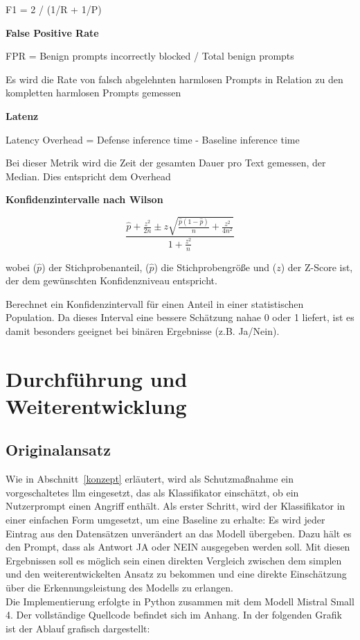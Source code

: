 F1 = 2 / (1/R + 1/P)

\textbf{False Positive Rate}~\cite[22]{sm27}

FPR = Benign prompts incorrectly blocked / Total benign prompts

Es wird die Rate von falsch abgelehnten harmlosen Prompts in Relation zu den kompletten harmlosen Prompts gemessen

\textbf{Latenz}~\cite[22]{sm27}

Latency Overhead = Defense inference time - Baseline inference time

Bei dieser Metrik wird die Zeit der gesamten Dauer pro Text gemessen, der Median. Dies entspricht dem Overhead

\textbf{Konfidenzintervalle nach Wilson}~\cite{sm44}

\[ \frac{\hat{p} + \frac{z^2}{2n} \pm z\sqrt{\frac{\hat{p}(1-\hat{p})}{n} + \frac{z^2}{4n^2}}}{1+\frac{z^2}{n}} \]

wobei (\(\hat{p}\)) der Stichprobenanteil, (\(\hat{p}\)) die Stichprobengröße und (\(z\)) der Z-Score ist, der dem gewünschten Konfidenzniveau entspricht.

Berechnet ein Konfidenzintervall für einen Anteil in einer statistischen Population. Da dieses Interval eine bessere Schätzung nahae 0 oder 1 liefert, ist es damit
besonders geeignet bei binären Ergebnisse (z.B. Ja/Nein).


\section{Durchführung und Weiterentwicklung}

\subsection{Originalansatz}

Wie in Abschnitt~\ref{konzept} erläutert, wird als Schutzmaßnahme ein vorgeschaltetes \ac{llm} eingesetzt, das als Klassifikator einschätzt, ob ein Nutzerprompt
einen Angriff enthält. Als erster Schritt, wird der Klassifikator in einer einfachen Form umgesetzt, um eine Baseline zu erhalte: Es wird jeder Eintrag aus den 
Datensätzen unverändert an das Modell übergeben. Dazu hält es den Prompt, dass als Antwort JA oder NEIN ausgegeben werden soll. Mit diesen Ergebnissen soll
es möglich sein einen direkten Vergleich zwischen dem simplen und den weiterentwickelten Ansatz zu bekommen und eine direkte Einschätzung über die 
Erkennungsleistung des Modells zu erlangen. \\
Die Implementierung erfolgte in Python zusammen mit dem Modell Mistral Small 4. Der vollständige Quellcode befindet sich im Anhang. In der folgenden Grafik
ist der Ablauf grafisch dargestellt: \\

